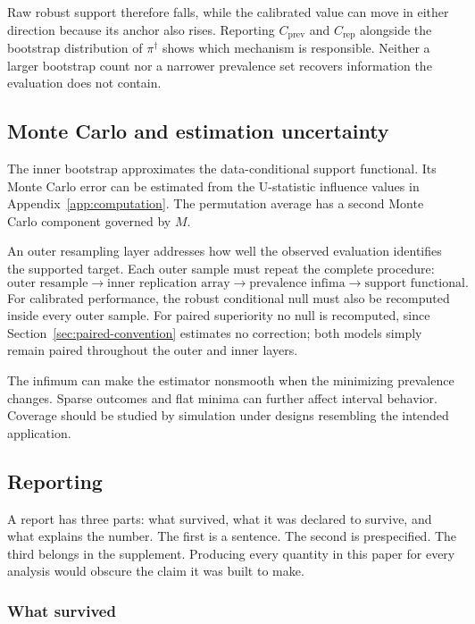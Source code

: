 \documentclass[11pt]{article}
\theoremstyle{remark}
\begin{document}
Raw robust support therefore falls, while the calibrated value can move in either direction because its anchor also rises. Reporting $C_{\mathrm{prev}}$ and $C_{\mathrm{rep}}$ alongside the bootstrap distribution of $\pi^\dagger$ shows which mechanism is responsible. Neither a larger bootstrap count nor a narrower prevalence set recovers information the evaluation does not contain.

\subsection{Monte Carlo and estimation uncertainty}

The inner bootstrap approximates the data-conditional support functional. Its Monte Carlo error can be estimated from the U-statistic influence values in Appendix~\ref{app:computation}. The permutation average has a second Monte Carlo component governed by $M$.

An outer resampling layer addresses how well the observed evaluation identifies the supported target. Each outer sample must repeat the complete procedure:
\[
\text{outer resample}
\longrightarrow
\text{inner replication array}
\longrightarrow
\text{prevalence infima}
\longrightarrow
\text{support functional}.
\]
For calibrated performance, the robust conditional null must also be recomputed inside every outer sample. For paired superiority no null is recomputed, since Section~\ref{sec:paired-convention} estimates no correction; both models simply remain paired throughout the outer and inner layers.

The infimum can make the estimator nonsmooth when the minimizing prevalence changes. Sparse outcomes and flat minima can further affect interval behavior. Coverage should be studied by simulation under designs resembling the intended application.

\subsection{Reporting}

A report has three parts: what survived, what it was declared to survive, and what explains the number. The first is a sentence. The second is prespecified. The third belongs in the supplement. Producing every quantity in this paper for every analysis would obscure the claim it was built to make.

\subsubsection*{What survived}
\end{document}
